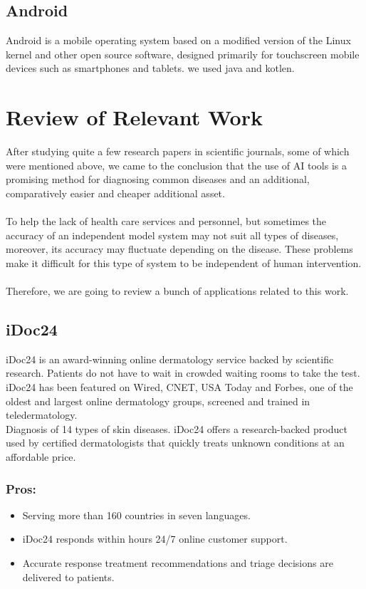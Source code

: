 \subsection{Android}
Android is a mobile operating system based on a modified version of the Linux kernel and other open source software, designed primarily for touchscreen mobile devices such as smartphones and tablets. we used java and kotlen.

\section{Review of Relevant Work }
After studying quite a few research papers in scientific journals, some of which were mentioned above, we came to the conclusion that the use of AI tools is a promising method for diagnosing common diseases and an additional, comparatively easier and cheaper additional asset.\\\\
To help the lack of health care services and personnel, but sometimes the accuracy of an independent model system may not suit all types of diseases, moreover, its accuracy may fluctuate depending on the disease. These problems make it difficult for this type of system to be independent of human intervention.\\\\
Therefore, we are going to review a bunch of applications related to this work.

\subsection{iDoc24}
iDoc24 is an award-winning online dermatology service backed by scientific research. Patients do not have to wait in crowded waiting rooms to take the test.\\
iDoc24 has been featured on Wired, CNET, USA Today and Forbes, one of the oldest and largest online dermatology groups, screened and trained in teledermatology.\\
 Diagnosis of 14 types of skin diseases. iDoc24 offers a research-backed product used by certified dermatologists that quickly treats unknown conditions at an affordable price.
 \subsubsection{Pros:}
 \begin{itemize}
     \item Serving more than 160 countries in seven languages.\\
     \item iDoc24 responds within hours 24/7 online customer support.\\
     \item Accurate response treatment recommendations and triage decisions are delivered to patients.\\
 \end{itemize}
